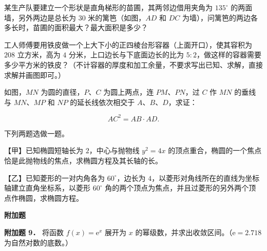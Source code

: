 \begin{question}
某生产队要建立一个形状是直角梯形的苗圃，其两邻边借用夹角为 $135^\circ$ 的两面墙，另外两边是总长为 $30$ 米的篱笆（如图，$AD$ 和 $DC$ 为墙），问篱笆的两边各多长时，苗圃的面积最大？最大面积是多少？
\nopagebreak[4]
\begin{center}\end{center}
\nopagebreak[4]
\end{question}
\begin{question}
工人师傅要用铁皮做一个上大下小的正四棱台形容器（上面开口），使其容积为 $208$ 立方米，高为 $4$ 分米，上口边长与下底面边长的比为 $5:2$，做这样的容器需要多少平方米的铁皮？（不计容器的厚度和加工余量，不要求写出已知、求解，直接求解并画图即可。）

\Needspace{0.4\textheight}
\end{question}
\begin{question}
如图，$MN$ 为圆的直径，$P\text{、}C$ 为圆上两点，连 $PM\text{、}PN$，过 $C$ 作 $MN$ 的垂线与 $MN\text{、}MP$ 和 $NP$ 的延长线依次相交于 $A\text{、}B\text{、}D$，求证：

\nopagebreak[4]
\[
AC^2=AB\cdot AD.
\]
\nopagebreak[4]
\begin{center}\end{center}
\nopagebreak[4]
\end{question}
\begin{question}
下列两题选做一题。

【甲】已知椭圆短轴长为 $2$，中心与抛物线 $y^2=4x$ 的顶点重合，椭圆的一个焦点恰是此抛物线的焦点，求椭圆方程及其长轴的长。

【乙】已知菱形的一对内角各为 $60^\circ$，边长为 $4$，以菱形对角线所在的直线为坐标轴建立直角坐标系，以菱形 $60^\circ$ 角的两个顶点为焦点，并且过菱形的另外两个顶点作椭圆，求椭圆方程。

\begin{gktip}
\Needspace{0.25\textheight}
\textbf{附加题}
\end{gktip}

\textbf{附加题 9．} 将函数 $f(x)=\mathrm e^x$ 展开为 $x$ 的幂级数，并求出收敛区间。（$\mathrm e=2.718$ 为自然对数的底数。）

\end{question}